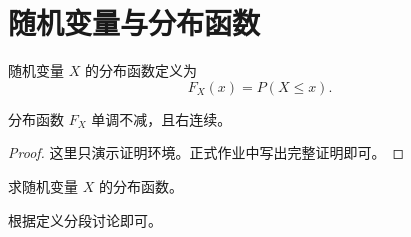\documentclass[12pt,a4paper]{scrartcl}
\begin{document}
\makecompacttitle

\section{随机变量与分布函数}

\begin{definition}
随机变量 $X$ 的分布函数定义为
\[
  F_X(x)=P(X\le x).
\]
\end{definition}

\begin{theorem}
分布函数 $F_X$ 单调不减，且右连续。
\end{theorem}

\begin{proof}
这里只演示证明环境。正式作业中写出完整证明即可。
\end{proof}

\begin{questions}
  \item 求随机变量 $X$ 的分布函数。
  \begin{solution}
  根据定义分段讨论即可。
  \end{solution}
\end{questions}
\end{document}

